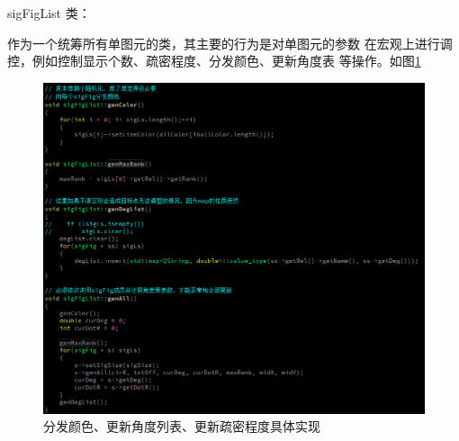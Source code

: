 \documentclass[a4paper,UTF8]{article}
\numberwithin{equation}{section}
\begin{document}
\par sigFigList 类：
\par 作为一个统筹所有单图元的类，其主要的行为是对单图元的参数
在宏观上进行调控，例如控制显示个数、疏密程度、分发颜色、更新角度表
等操作。如图\ref{task6-sigFigList}
\begin{figure}[htbp]
    \centering
    \includegraphics[width = 15cm]{task6-sigFigList.png}
    \caption{分发颜色、更新角度列表、更新疏密程度具体实现}
    \label{task6-sigFigList}
\end{figure}
\end{document}
